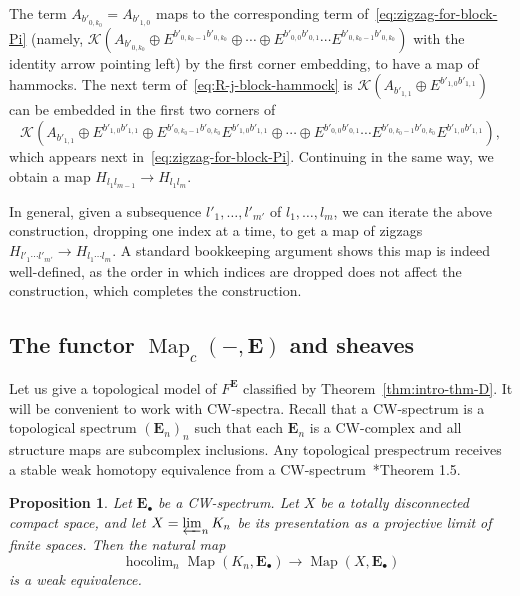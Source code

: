 \documentclass[a4paper,reqno]{amsart}
\theoremstyle{plain}
\newtheorem{proposition}[theorem]{Proposition}
\theoremstyle{definition}
\theoremstyle{remark}
\numberwithin{equation}{section}
\newcommand{\cK}{\mathcal{K}}
\newcommand{\bE}{\mathbf{E}}
\DeclareMathOperator*{\hocolim}{hocolim}
\DeclareMathOperator{\Map}{Map}
\begin{document}
The term $A_{b'_{0, k_0}} = A_{b'_{1, 0}}$ maps to the corresponding term of~\eqref{eq:zigzag-for-block-Pi} (namely, $\cK(A_{b'_{0,k_0}} \oplus E^{b'_{0,k_0-1} b'_{0,k_0}} \oplus \cdots \oplus E^{b'_{0,0} b'_{0,1}} \cdots E^{b'_{0,k_0-1} b'_{0,k_0}})$ with the identity arrow pointing left) by the first corner embedding, to have a map of hammocks.
The next term of~\eqref{eq:R-j-block-hammock} is $\cK(A_{b'_{1,1}} \oplus E^{b'_{1,0} b'_{1,1}})$ can be embedded in the first two corners of
\[
\cK(A_{b'_{1,1}} \oplus E^{b'_{1,0} b'_{1,1}} \oplus E^{b'_{0,k_0-1} b'_{0,k_0}} E^{b'_{1,0} b'_{1,1}} \oplus \cdots \oplus E^{b'_{0,0} b'_{0,1}} \cdots E^{b'_{0,k_0-1} b'_{0,k_0}} E^{b'_{1,0} b'_{1,1}}),
\]
which appears next in~\eqref{eq:zigzag-for-block-Pi}.
Continuing in the same way, we obtain a map $H_{l_1 l_{m-1}} \to H_{l_1 l_{m}}$.

In general, given a subsequence $l'_1, \ldots, l'_{m'}$ of $l_1, \ldots, l_m$, we can iterate the above construction, dropping one index at a time, to get a map of zigzags $H_{l'_1 \cdots l'_{m'}} \to H_{l_1 \cdots l_m}$. A standard bookkeeping argument shows this map is indeed well-defined, as the order in which indices are dropped does not affect the construction, which completes the construction.

\subsection{The functor \texorpdfstring{$\Map_c(-,\bE)$}{Map_c(-, E)} and sheaves}\label{subsec:mapcsheaves}

Let us give a topological model of $F^\bE$ classified by Theorem~\ref{thm:intro-thm-D}.
It will be convenient to work with CW-spectra.
Recall that a CW-spectrum is a topological spectrum $(\bE_n)_n$ such that each $\bE_n$ is a CW-complex and all structure maps are subcomplex inclusions. Any topological prespectrum receives a stable weak homotopy equivalence from a CW-spectrum~\cite{ekmm:modern}*{Theorem 1.5}. 

\begin{proposition}%
Let $\bE_\bullet$ be a CW-spectrum.
Let $X$ be a totally disconnected compact space, and let $X = \varprojlim_n K_n$ be its presentation as a projective limit of finite spaces.
Then the natural map
\begin{equation}\label{eq:profin-dom-comparison}
\hocolim_n \Map(K_n, \bE_\bullet) \to \Map(X, \bE_\bullet)
\end{equation}
is a weak equivalence.
\end{proposition}
\end{document}

